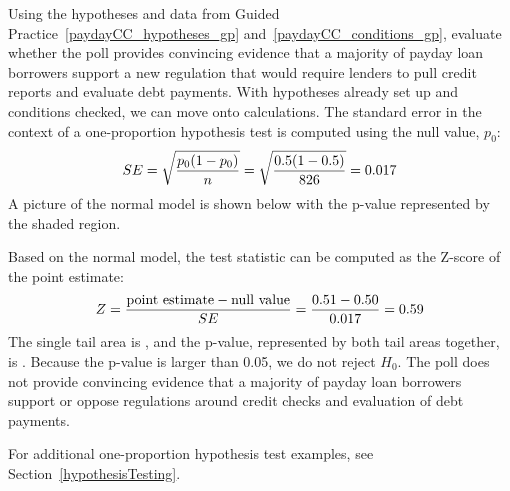 \begin{examplewrap}
\begin{nexample}{Using the hypotheses and data from
    Guided Practice~\ref{paydayCC_hypotheses_gp}
    and~\ref{paydayCC_conditions_gp},
    evaluate whether the poll provides convincing evidence
    that a majority of payday loan borrowers support
    a new regulation that would
    require lenders to pull credit reports
    and evaluate debt payments.}
  With hypotheses already set up and conditions checked,
  we can move onto calculations.
  The standard error in the context of a one-proportion
  hypothesis test is computed using the null value, $p_0$:
  \begin{align*}
  SE = \sqrt{\frac{p_0 (1 - p_0)}{n}}
      = \sqrt{\frac{0.5 (1 - 0.5)}{826{}}}
      = 0.017{}
  \end{align*}
  A picture of the normal model is shown below
  with the p-value represented by the shaded region.
  \begin{center}
  \end{center}
  Based on the normal model, the test statistic can be
  computed as the Z-score of the point estimate:
  \begin{align*}
  Z = \frac{\text{point estimate} - \text{null value}}{SE}
      = \frac{0.51{} - 0.50}{0.017{}}
      = 0.59{}
  \end{align*}
  The single tail area is \paydayCCOneTail{}, and the p-value,
  represented by both tail areas together, is \paydayCCPvalue{}.
  Because the p-value is larger than 0.05,
  we do not reject $H_0$.
  The poll does not provide convincing evidence that
  a majority of payday loan borrowers support or oppose
  regulations around credit checks and evaluation of
  debt payments.
\end{nexample}
\end{examplewrap}

\oneprophtsummary{}


\noindent%
For additional one-proportion hypothesis test examples,
see Section~\ref{hypothesisTesting}.

